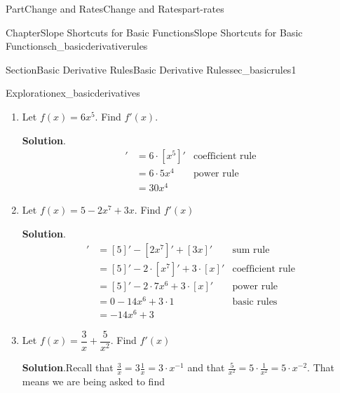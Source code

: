 \documentclass[oneside,10pt,]{tufte-book}
\newcommand{\blocktitlefont}{\relax}
\numberwithin{equation}{chapter}
\newcommand{\red}[1]{   {\color{red}   #1}   }
\newcommand{\blue}[1]{  {\color{blue}  #1}  }
\newcommand{\amp}{&}
\begin{document}
\begin{partptx}{Part}{Change and Rates}{}{Change and Rates}{}{}{part-rates}
\begin{chapterptx}{Chapter}{Slope Shortcuts for Basic Functions}{}{Slope Shortcuts for Basic Functions}{}{}{ch_basicderivativerules}
\begin{sectionptx}{Section}{Basic Derivative Rules}{}{Basic Derivative Rules}{}{}{sec_basicrules1}
\begin{exploration}{Exploration}{}{ex_basicderivatives}
\begin{enumerate}[font=\bfseries,label=(\alph*),ref=\alph*]
\begin{equation*}
[mx + b]' = 17
\end{equation*}
%
\par
You can also find this derivative using the formula for derivatives of sums and differences, for constant coefficients \([m\cdot f(x)]' = m\cdot [f(x)]'\) and the formulas  \([x]' = 1\) and \([m]' = 0\) for any number \(m\).%
\begin{align*}
[ \red{ 17x}  - {\blue 3}] \amp = [17x]' - [3]' \amp \text{sum rule}\\
\amp = 17[x]' - [3]' \amp \text{coefficient rule}\\
\amp = 17\cdot 1 - 0\amp\text{basic rules}\\
\amp = 17
\end{align*}
%
\item{}Let \(f(x) = 6x^5\).  Find \(f'(x)\).%
\par\smallskip%
\noindent\textbf{\blocktitlefont Solution}.\hypertarget{ex_basicderivatives-2-2}{}\quad{}%
\begin{align*}
[6x^5]' \amp = 6\cdot [x^5]' \amp \text{coefficient rule}\\
\amp = 6\cdot 5x^4 \amp\text{power rule}\\
\amp = 30 x^4
\end{align*}
%
\item{}Let \(f(x) = 5 - 2 x^7 + 3x\).  Find \(f'(x)\)%
\par\smallskip%
\noindent\textbf{\blocktitlefont Solution}.\hypertarget{ex_basicderivatives-3-2}{}\quad{}%
\begin{align*}
[5 - 2x^5 + 3x]' \amp = [5]' - [2x^7]' + [3x]' \amp \text{sum rule}\\
\amp = [5]' - 2\cdot [x^7]' + 3\cdot[x]' \amp \text{coefficient rule}\\
\amp = [5]' - 2\cdot 7 x^6 + 3\cdot[x]' \amp\text{power rule}\\
\amp = 0 - 14 x^6 + 3\cdot 1 \amp\text{basic rules}\\
\amp = -14x^6 + 3
\end{align*}
%
\item{}Let \(f(x) = \dfrac{3}{x} + \dfrac{5}{x^2}\). Find \(f'(x)\)%
\par\smallskip%
\noindent\textbf{\blocktitlefont Solution}.\hypertarget{ex_basicderivatives-4-2}{}\quad{}Recall that \(\frac{3}{x} = 3\frac{1}{x} = 3\cdot x^{-1}\) and that \(\frac{5}{x^2} = 5\cdot\frac{1}{x^2} = 5\cdot x^{-2}\). That means we are being asked to find%
\begin{align*}

\end{align*}
\end{enumerate}
\end{exploration}
\end{sectionptx}
\end{chapterptx}
\end{partptx}
\end{document}
